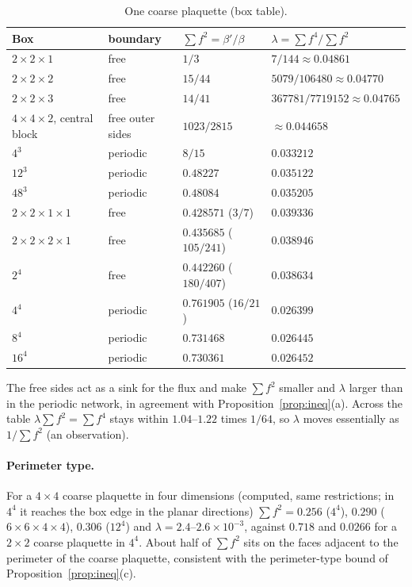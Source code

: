\documentclass[11pt,a4paper]{article}
\theoremstyle{definition}
\theoremstyle{remark}
\begin{document}
\begin{table}[h]\centering\small
\caption{One coarse plaquette (box table).}\label{tab:box}
\begin{tabular}{@{}llll@{}}
\toprule
Box & boundary & $\sum f^2=\beta'/\beta$ & $\lambda=\sum f^4/\sum f^2$\\ \midrule
$2\times2\times1$ & free & $1/3$ & $7/144\approx0.04861$\\
$2\times2\times2$ & free & $15/44$ & $5079/106480\approx0.04770$\\
$2\times2\times3$ & free & $14/41$ & $367781/7719152\approx0.04765$\\
$4\times4\times2$, central block & free outer sides & $1023/2815$ & $\approx0.044658$\\
$4^3$ & periodic & $8/15$ & $0.033212$\\
$12^3$ & periodic & $0.48227$ & $0.035122$\\
$48^3$ & periodic & $0.48084$ & $0.035205$\\ \midrule
$2\times2\times1\times1$ & free & $0.428571$ ($3/7$) & $0.039336$\\
$2\times2\times2\times1$ & free & $0.435685$ ($105/241$) & $0.038946$\\
$2^4$ & free & $0.442260$ ($180/407$) & $0.038634$\\
$4^4$ & periodic & $0.761905$ ($16/21$) & $0.026399$\\
$8^4$ & periodic & $0.731468$ & $0.026445$\\
$16^4$ & periodic & $0.730361$ & $0.026452$\\
\bottomrule
\end{tabular}
\end{table}

The free sides act as a sink for the flux and make $\sum f^2$ smaller and $\lambda$ larger than in the periodic network, in agreement with Proposition~\ref{prop:ineq}(a). Across the table $\lambda\sum f^2=\sum f^4$ stays within $1.04$--$1.22$ times $1/64$, so $\lambda$ moves essentially as $1/\sum f^2$ (an observation).

\paragraph{Perimeter type.}
For a $4\times4$ coarse plaquette in four dimensions (computed, same restrictions; in $4^4$ it reaches the box edge in the planar directions) $\sum f^2=0.256$ ($4^4$), $0.290$ ($6\times6\times4\times4$), $0.306$ ($12^4$) and $\lambda=2.4$--$2.6\times10^{-3}$, against $0.718$ and $0.0266$ for a $2\times2$ coarse plaquette in $4^4$. About half of $\sum f^2$ sits on the faces adjacent to the perimeter of the coarse plaquette, consistent with the perimeter-type bound of Proposition~\ref{prop:ineq}(c).
\end{document}
